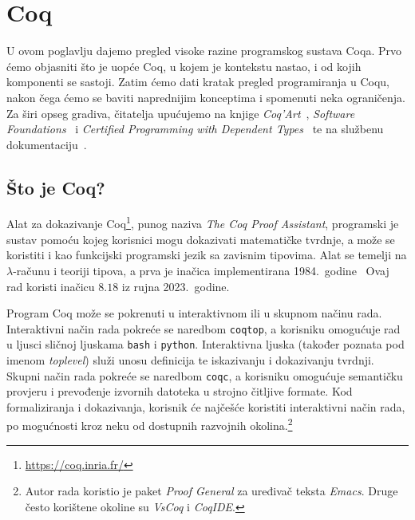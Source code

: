 \chapter{Coq}\label{chap:coq}
U ovom poglavlju dajemo pregled visoke razine programskog sustava Coqa.
Prvo ćemo objasniti što je uopće Coq, u kojem je kontekstu nastao, i od kojih komponenti se sastoji.
Zatim ćemo dati kratak pregled programiranja u Coqu, nakon čega ćemo se baviti naprednijim konceptima i spomenuti neka ograničenja.
Za širi opseg gradiva, čitatelja upućujemo na knjige \textit{Coq'Art}~\cite{coqart}, \textit{Software Foundations}~\cite{sf-lf, sf-plf, sf-vfa} i \textit{Certified Programming with Dependent Types}~\cite{cpdt} te na službenu dokumentaciju~\cite{coqrefman}.

\section{Što je Coq?}\label{sec:osnovno-o-coqu}
Alat za dokazivanje Coq\footnote{\url{https://coq.inria.fr/}}, punog naziva \textit{The Coq Proof Assistant},
programski je sustav pomoću kojeg korisnici mogu dokazivati matematičke tvrdnje, a može se koristiti i kao funkcijski programski jezik sa zavisnim tipovima.
Alat se temelji na \(\lambda\)-računu i teoriji tipova, a prva je inačica implementirana 1984.~godine~\cite{coqrefman}
Ovaj rad koristi inačicu \(8.18\) iz rujna 2023.~godine.

Program Coq može se pokrenuti u interaktivnom ili u skupnom načinu rada.
Interaktivni način rada pokreće se naredbom \texttt{coqtop}, a korisniku omogućuje rad u ljusci sličnoj ljuskama \texttt{bash} i \texttt{python}.
Interaktivna ljuska (također poznata pod imenom \textit{toplevel}) služi unosu definicija te iskazivanju i dokazivanju tvrdnji.
Skupni način rada pokreće se naredbom \texttt{coqc}, a korisniku omogućuje semantičku provjeru i prevođenje izvornih datoteka u strojno čitljive formate.
Kod formaliziranja i dokazivanja, korisnik će najčešće koristiti interaktivni način rada, po mogućnosti kroz neku od dostupnih razvojnih okolina.\footnote{Autor rada koristio je paket \textit{Proof General} za uređivač teksta \textit{Emacs}. Druge često korištene okoline su \textit{VsCoq} i \textit{CoqIDE}.}

